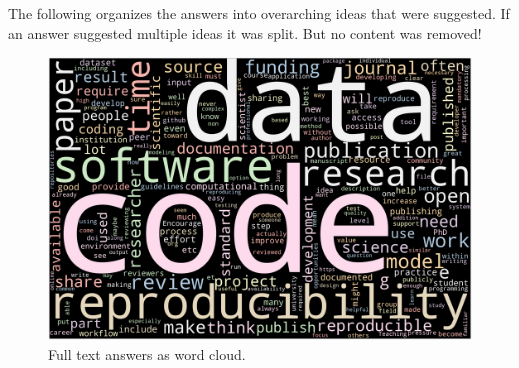 \documentclass{article}
\begin{document}
The following organizes the answers into overarching ideas that were suggested. If an answer suggested multiple ideas it was split. But no content was removed!

\begin{figure}[!h]
    \centering
    \includegraphics[width=\textwidth]{../word_cloud.png}
	\caption{Full text answers as word cloud.}
    \label{fig:wc}
\end{figure}
\end{document}
